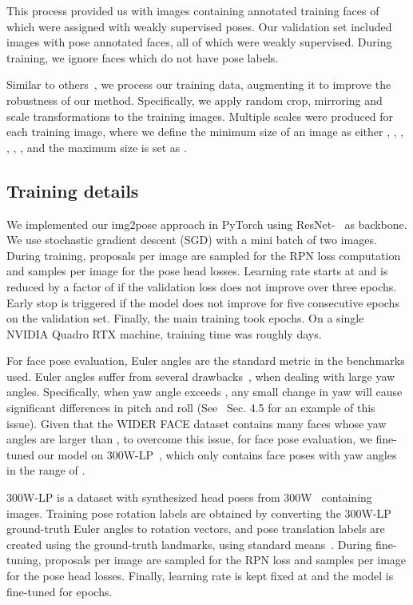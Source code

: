 \documentclass[final]{cvpr}
\newcommand{\minisection}[1]{\vspace{1mm}\noindent{\textbf{#1}.}}
\begin{document}
This process provided us with  images containing  annotated training faces of which  were assigned with weakly supervised poses. Our validation set included  images with  pose annotated faces, all of which were weakly supervised. During training, we ignore faces which do not have pose labels. 



\minisection{Data augmentation} Similar to others~\cite{fdnet}, we process our training data, augmenting it to improve the robustness of our method. Specifically, we apply random crop, mirroring and scale transformations to the training images. Multiple scales were produced for each training image, where we define the minimum size of an image as either , , , , , , and the maximum size is set as . 
\subsection{Training details}\label{sec:training}
We implemented our img2pose approach in PyTorch using ResNet-~\cite{resnet} as backbone. We use stochastic gradient descent (SGD) with a mini batch of two images. During training,  proposals per image are sampled for the RPN loss computation and  samples per image for the pose head losses. Learning rate starts at  and is reduced by a factor of  if the validation loss does not improve over three epochs. Early stop is triggered if the model does not improve for five consecutive epochs on the validation set. 
Finally, the main training took  epochs. On a single NVIDIA Quadro RTX  machine, training time was roughly  days.

For face pose evaluation, Euler angles are the standard metric in the benchmarks used.
Euler angles suffer from several drawbacks~\cite{trinet, quatnet}, when dealing with large yaw angles.
Specifically, when yaw angle exceeds , any small change in yaw will cause significant differences in pitch and roll (See~\cite{trinet} Sec. 4.5 for an example of this issue).
Given that the WIDER FACE dataset contains many faces whose yaw angles are larger than , 
to overcome this issue, for face pose evaluation, we fine-tuned our model on 300W-LP~\cite{3ddfa}, which only contains face poses with yaw angles in the range of .


300W-LP is a dataset with synthesized head poses from 300W~\cite{300w} containing  images.
Training pose rotation labels are obtained by converting the 300W-LP ground-truth Euler angles to rotation vectors, and pose translation labels are created using the ground-truth landmarks, using standard means~\cite{posit, epnp}.
During fine-tuning,  proposals per image are sampled for the RPN loss and  samples per image for the pose head losses.
Finally, learning rate is kept fixed at  and the model is fine-tuned for  epochs.
\end{document}
